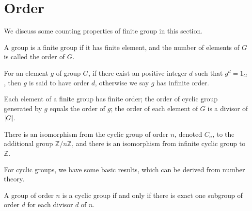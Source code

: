 \section{Order}
We discuss some counting properties of finite group in this section.
\begin{defi}
A group is a finite group if it has finite element, and the number of elements of $G$ is called the order of $G$.
\end{defi}
\begin{defi}
For an element $g$ of group $G$, if there exist an positive integer $d$ such that $g^d =1_G$, then $g$ is said to have order $d$, otherwise we say $g$ has infinite order.
\end{defi}
\begin{pro}
Each element of a finite group has finite order;
the order of cyclic group generated by $g$ equals the order of $g$;
the order of each element of $G$ is a divisor of $\left| {G} \right|$.
\end{pro}
\begin{thm}
There is an isomorphism from the cyclic group of order $n$, denoted $C_n$, to the additional group $\mathbb{Z}/n\mathbb{Z}$, and there is an isomorphism from infinite cyclic group to $\mathbb{Z}$.
\end{thm}
For cyclic groups, we have some basic results, which can be derived from number theory.
\begin{thm}
A group of order $n$ is a cyclic group if and only if there is exact one subgroup of order $d$ for each divisor $d$ of $n$.
\end{thm}


